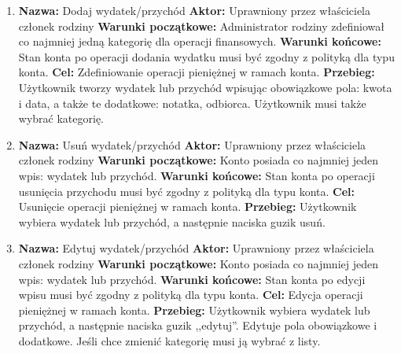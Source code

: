 \begin{enumerate}[labelwidth=1em,label=\arabic*.]
\item \textbf{Nazwa:} Dodaj wydatek/przychód \newline
    \textbf{Aktor:} Uprawniony przez właściciela członek rodziny \newline
    \textbf{Warunki początkowe:} Administrator rodziny zdefiniował co najmniej jedną kategorię dla operacji finansowych. \newline
    \textbf{Warunki końcowe:} Stan konta po operacji dodania wydatku musi być zgodny z polityką dla typu konta. \newline
    \textbf{Cel:} Zdefiniowanie operacji pieniężnej w ramach konta. \newline
    \textbf{Przebieg:} Użytkownik tworzy wydatek lub przychód wpisując obowiązkowe pola: kwota i data, a także te dodatkowe: notatka, odbiorca. Użytkownik musi także wybrać kategorię. 
\item \textbf{Nazwa:} Usuń wydatek/przychód \newline
    \textbf{Aktor:} Uprawniony przez właściciela członek rodziny \newline
    \textbf{Warunki początkowe:} Konto posiada co najmniej jeden wpis: wydatek lub przychód. \newline
    \textbf{Warunki końcowe:} Stan konta po operacji usunięcia przychodu musi być zgodny z polityką dla typu konta. \newline
    \textbf{Cel:} Usunięcie operacji pieniężnej w ramach konta. \newline
    \textbf{Przebieg:} Użytkownik wybiera wydatek lub przychód, a następnie naciska guzik usuń. 
\item \textbf{Nazwa:} Edytuj wydatek/przychód \newline
    \textbf{Aktor:} Uprawniony przez właściciela członek rodziny \newline
    \textbf{Warunki początkowe:} Konto posiada co najmniej jeden wpis: wydatek lub przychód. \newline
    \textbf{Warunki końcowe:} Stan konta po edycji wpisu musi być zgodny z polityką dla typu konta. \newline
    \textbf{Cel:} Edycja operacji pieniężnej w ramach konta. \newline
    \textbf{Przebieg:} Użytkownik wybiera wydatek lub przychód, a następnie naciska guzik ,,edytuj''. Edytuje pola obowiązkowe i dodatkowe. Jeśli chce zmienić kategorię musi ją wybrać z listy. \newline

\end{enumerate}
